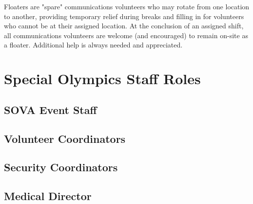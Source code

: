 \documentclass[pdflatex,letterpaper,twoside,12pt]{book}
\begin{document}
Floaters are "spare" communications volunteers who may rotate from one location to another, providing temporary relief during breaks and filling in for volunteers who cannot be at their assigned location.  At the conclusion of an assigned shift, all communications volunteers are welcome (and encouraged) to remain on-site as a floater.  Additional help is always needed and appreciated.


\chapter{Special Olympics Staff Roles}

\section{SOVA Event Staff}


\section{Volunteer Coordinators}


\section{Security Coordinators}


\section{Medical Director}
\end{document}
